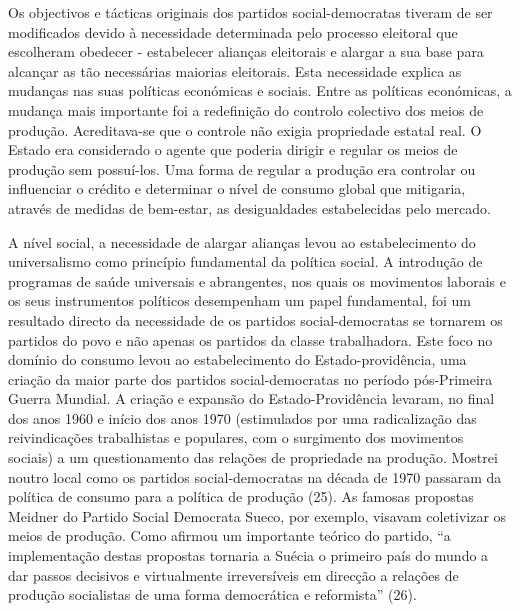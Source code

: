 {{{ \par 
Os objectivos e tácticas originais dos partidos social-democratas tiveram de ser modificados devido à necessidade determinada pelo processo eleitoral que escolheram obedecer - estabelecer alianças eleitorais e alargar a sua base para alcançar as tão necessárias maiorias eleitorais. Esta necessidade explica as mudanças nas suas políticas económicas e sociais. Entre as políticas económicas, a mudança mais importante foi a redefinição do controlo colectivo dos meios de produção. Acreditava-se que o controle não exigia propriedade estatal real. O Estado era considerado o agente que poderia dirigir e regular os meios de produção sem possuí-los. Uma forma de regular a produção era controlar ou influenciar o crédito e determinar o nível de consumo global que mitigaria, através de medidas de bem-estar, as desigualdades estabelecidas pelo mercado.
 \par 
A nível social, a necessidade de alargar alianças levou ao estabelecimento do universalismo como princípio fundamental da política social. A introdução de programas de saúde universais e abrangentes, nos quais os movimentos laborais e os seus instrumentos políticos desempenham um papel fundamental, foi um resultado directo da necessidade de os partidos social-democratas se tornarem os partidos do povo e não apenas os partidos da classe trabalhadora. Este foco no domínio do consumo levou ao estabelecimento do Estado-providência, uma criação da maior parte dos partidos social-democratas no período pós-Primeira Guerra Mundial. A criação e expansão do Estado-Providência levaram, no final dos anos 1960 e início dos anos 1970 (estimulados por uma radicalização das reivindicações trabalhistas e populares, com o surgimento dos movimentos sociais) a um questionamento das relações de propriedade na produção. Mostrei noutro local como os partidos social-democratas na década de 1970 passaram da política de consumo para a política de produção (25). As famosas propostas Meidner do Partido Social Democrata Sueco, por exemplo, visavam coletivizar os meios de produção. Como afirmou um importante teórico do partido, “a implementação destas propostas tornaria a Suécia o primeiro país do mundo a dar passos decisivos e virtualmente irreversíveis em direcção a relações de produção socialistas de uma forma democrática e reformista” (26).
 \par 
}}}
